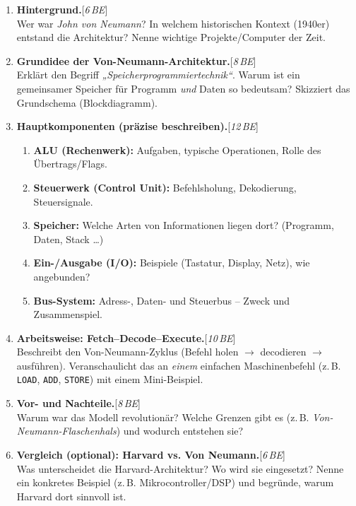 \documentclass[11pt,a4paper]{scrartcl}
\newenvironment{aufgaben}{%
	\begin{enumerate}[leftmargin=*,label=\textbf{Aufgabe~\arabic*:}, itemsep=0.6em]
	}{\end{enumerate}}
\newcommand{\punkte}[1]{\hfill{\small[\textit{#1\,BE}]}}
\begin{document}
	\begin{aufgaben}
		
		\item \textbf{Hintergrund.}\punkte{6}\\
		Wer war \emph{John von Neumann}? In welchem historischen Kontext (1940er) entstand die Architektur? Nenne wichtige Projekte/Computer der Zeit.
		
		\item \textbf{Grundidee der Von-Neumann-Architektur.}\punkte{8}\\
		Erklärt den Begriff \emph{„Speicherprogrammiertechnik“}. Warum ist ein gemeinsamer Speicher für Programm \emph{und} Daten so bedeutsam? Skizziert das Grundschema (Blockdiagramm).
		
		\item \textbf{Hauptkomponenten (präzise beschreiben).}\punkte{12}\\
		\begin{enumerate}[label*=\alph*)]
			\item \textbf{ALU (Rechenwerk):} Aufgaben, typische Operationen, Rolle des Übertrags/Flags.\\
			\item \textbf{Steuerwerk (Control Unit):} Befehlsholung, Dekodierung, Steuersignale.\\
			\item \textbf{Speicher:} Welche Arten von Informationen liegen dort? (Programm, Daten, Stack \dots)\\
			\item \textbf{Ein-/Ausgabe (I/O):} Beispiele (Tastatur, Display, Netz), wie angebunden?\\
			\item \textbf{Bus-System:} Adress-, Daten- und Steuerbus – Zweck und Zusammenspiel.
		\end{enumerate}
		
		\item \textbf{Arbeitsweise: Fetch–Decode–Execute.}\punkte{10}\\
		Beschreibt den Von-Neumann-Zyklus (Befehl holen $\to$ decodieren $\to$ ausführen). Veranschaulicht das an \emph{einem} einfachen Maschinenbefehl (z.\,B. \texttt{LOAD}, \texttt{ADD}, \texttt{STORE}) mit einem Mini-Beispiel.
		
		\item \textbf{Vor- und Nachteile.}\punkte{8}\\
		Warum war das Modell revolutionär? Welche Grenzen gibt es (z.\,B. \emph{Von-Neumann-Flaschenhals}) und wodurch entstehen sie?
		
		\item \textbf{Vergleich (optional): Harvard vs. Von Neumann.}\punkte{6}\\
		Was unterscheidet die Harvard-Architektur? Wo wird sie eingesetzt? Nenne ein konkretes Beispiel (z.\,B. Mikrocontroller/DSP) und begründe, warum Harvard dort sinnvoll ist.
		
	\end{aufgaben}
	
\end{document}
